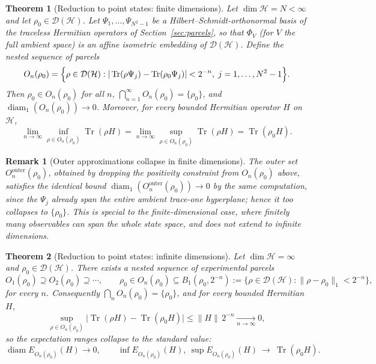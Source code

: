 \documentclass[11pt, onecolumn]{article}
\newtheorem{theorem}{Theorem}
\newtheorem{remark}{Remark}
\begin{document}
\begin{theorem}[Reduction to point states: finite dimensions]
\label{thm:reduction-finite}
Let $\dim\mathcal{H} = N < \infty$ and let $\rho_0 \in \mathcal{D}(\mathcal{H})$. Let $\Psi_1,\dots,\Psi_{N^2-1}$ be a Hilbert--Schmidt-orthonormal basis of the traceless Hermitian operators of Section~\ref{sec:parcels}, so that $\Phi_V$ (for $V$ the full ambient space) is an affine isometric embedding of $\mathcal D(\mathcal H)$. Define the nested sequence of parcels
\[
O_n(\rho_0) = \Bigl\{\rho \in \mathcal{D}(\mathcal{H}) :
|\operatorname{Tr}(\rho \Psi_j) - \operatorname{Tr}(\rho_0 \Psi_j)| < 2^{-n},\;
j = 1,\dots,N^2-1\Bigr\}.
\]
Then $\rho_0 \in O_n(\rho_0)$ for all $n$, $\bigcap_{n=1}^\infty O_n(\rho_0) = \{\rho_0\}$, and $\operatorname{diam}_1(O_n(\rho_0))\to0$. Moreover, for every bounded Hermitian operator $H$ on $\mathcal{H}$,
\[
\lim_{n\to\infty} \inf_{\rho \in O_n(\rho_0)} \operatorname{Tr}(\rho H)
= \lim_{n\to\infty} \sup_{\rho \in O_n(\rho_0)} \operatorname{Tr}(\rho H)
= \operatorname{Tr}(\rho_0 H).
\]
\end{theorem}

\begin{remark}[Outer approximations collapse in finite dimensions]
\label{rem:finite-outer-collapse}
The outer set $O_n^{\mathrm{outer}}(\rho_0)$, obtained by dropping the positivity constraint from $O_n(\rho_0)$ above, satisfies the identical bound $\operatorname{diam}_1(O_n^{\mathrm{outer}}(\rho_0))\to0$ by the same computation, since the $\Psi_j$ already span the entire ambient trace-one hyperplane; hence it too collapses to $\{\rho_0\}$. This is special to the finite-dimensional case, where finitely many observables can span the whole state space, and does not extend to infinite dimensions.
\end{remark}

\begin{theorem}[Reduction to point states: infinite dimensions]
\label{thm:reduction-infinite-bounded}
Let $\dim\mathcal H=\infty$ and $\rho_0\in\mathcal D(\mathcal H)$. There exists a nested sequence of experimental parcels
\[
O_1(\rho_0)\supseteq O_2(\rho_0)\supseteq\cdots,
\qquad
\rho_0\in O_n(\rho_0)\subseteq B_1(\rho_0,2^{-n}):=\bigl\{\rho\in\mathcal D(\mathcal H):\|\rho-\rho_0\|_1<2^{-n}\bigr\},
\]
for every $n$. Consequently $\bigcap_n O_n(\rho_0)=\{\rho_0\}$, and for every bounded Hermitian $H$,
\[
\sup_{\rho\in O_n(\rho_0)}\bigl|\operatorname{Tr}(\rho H)-\operatorname{Tr}(\rho_0H)\bigr| \le \|H\|\,2^{-n}\xrightarrow[n\to\infty]{}0,
\]
so the expectation ranges collapse to the standard value:
\[
\operatorname{diam} E_{O_n(\rho_0)}(H)\longrightarrow0,
\qquad
\inf E_{O_n(\rho_0)}(H),\ \sup E_{O_n(\rho_0)}(H)\ \longrightarrow\ \operatorname{Tr}(\rho_0H).
\]
\end{theorem}
\end{document}
